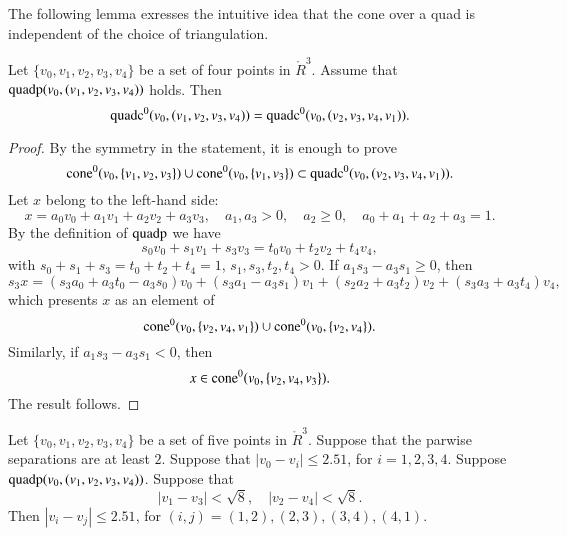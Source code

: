 \newpage

The following lemma exresses the intuitive idea that the cone
over a quad is independent of the choice of triangulation.

\begin{lemma}
Let $\{v_0,v_1,v_2,v_3,v_4\}$ be a set of four points in $\ring{R}^3$.
Assume that ${\operatorname{quadp}}(v_0,(v_1,v_2,v_3,v_4))$ holds.
Then 
 $${\operatorname{quadc}}^0(v_0,(v_1,v_2,v_3,v_4))  
  = {\operatorname{quadc}}^0(v_0,(v_2,v_3,v_4,v_1)).
 $$
\end{lemma}

\begin{proof}
By the symmetry in the statement, it is enough to prove 
  $${\operatorname{cone}}^0(v_0,\{v_1,v_2,v_3\})\cup{\operatorname{cone}}^0(v_0,\{v_1,v_3\})
  \subset {\operatorname{quadc}}^0(v_0,(v_2,v_3,v_4,v_1)).$$
Let $x$ belong to the left-hand side:
  $$
  x = a_0 v_0 + a_1 v_1 + a_2 v_2 + a_3 v_3,
  \quad a_1,a_3 > 0,\quad a_2\ge 0,\quad a_0+a_1+a_2+a_3=1.
  $$
By the definition of ${\operatorname{quadp}}$ we have
$$
  s_0 v_0 + s_1 v_1 + s_3 v_3 = t_0 v_0 + t_2 v_2 + t_4 v_4,
$$
with $s_0 + s_1 + s_3 = t_0 + t_2 + t_4 = 1$, $s_1,s_3,t_2,t_4>0$.
If $a_1 s_3 - a_3 s_1 \ge 0$, then
  $$s_3 x = (s_3 a_0 + a_3 t_0 - a_3 s_0) v_0 + 
          (s_3 a_1 - a_3 s_1) v_1 + (s_2 a_2 + a_3 t_2) v_2 +
          (s_3 a_3 + a_3 t_4) v_4,$$
which presents $x$ as an element of 
 $$
 {\operatorname{cone}}^0(v_0,\{v_2,v_4,v_1\}) \cup{\operatorname{cone}}^0(v_0,\{v_2,v_4\}).
 $$
Similarly, if $a_1 s_3 - a_3 s_1 < 0$, then
  $$
  x\in {\operatorname{cone}}^0(v_0,\{v_2,v_4,v_3\}).
  $$
The result follows.
\end{proof}

\newpage


\begin{lemma}  
Let $\{v_0,v_1,v_2,v_3,v_4\}$ be a set of five points in
$\ring{R}^3$.  Suppose that the parwise separations are at
least $2$.
Suppose that $|v_0-v_i|\le 2.51$, for $i=1,2,3,4$.
Suppose ${\operatorname{quadp}}(v_0,(v_1,v_2,v_3,v_4))$.
Suppose that
  $$|v_1-v_3|<\sqrt8,\quad |v_2-v_4| <\sqrt8.$$
Then $|v_i-v_j|\le 2.51$, for $(i,j)=(1,2),(2,3),(3,4),(4,1)$.
\end{lemma}



